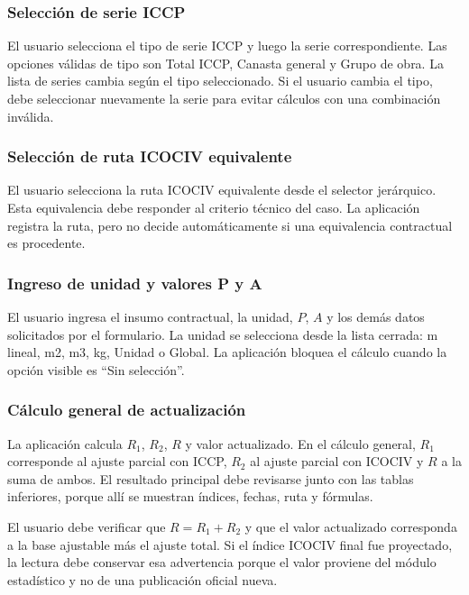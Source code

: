 \documentclass[12pt,letterpaper]{article}
\newcommand{\ICOCIV}{ICOCIV}
\newcommand{\ICCP}{ICCP}
\begin{document}
\subsubsection{Selección de serie ICCP}

El usuario selecciona el tipo de serie \ICCP{} y luego la serie correspondiente. Las opciones válidas de tipo son Total \ICCP, Canasta general y Grupo de obra. La lista de series cambia según el tipo seleccionado. Si el usuario cambia el tipo, debe seleccionar nuevamente la serie para evitar cálculos con una combinación inválida.

\subsubsection{Selección de ruta ICOCIV equivalente}

El usuario selecciona la ruta \ICOCIV{} equivalente desde el selector jerárquico. Esta equivalencia debe responder al criterio técnico del caso. La aplicación registra la ruta, pero no decide automáticamente si una equivalencia contractual es procedente.

\subsubsection{Ingreso de unidad y valores P y A}

El usuario ingresa el insumo contractual, la unidad, \(P\), \(A\) y los demás datos solicitados por el formulario. La unidad se selecciona desde la lista cerrada: m lineal, m2, m3, kg, Unidad o Global. La aplicación bloquea el cálculo cuando la opción visible es ``Sin selección''.

\subsubsection{Cálculo general de actualización}

La aplicación calcula \(R_1\), \(R_2\), \(R\) y valor actualizado. En el cálculo general, \(R_1\) corresponde al ajuste parcial con \ICCP, \(R_2\) al ajuste parcial con \ICOCIV{} y \(R\) a la suma de ambos. El resultado principal debe revisarse junto con las tablas inferiores, porque allí se muestran índices, fechas, ruta y fórmulas.

El usuario debe verificar que \(R=R_1+R_2\) y que el valor actualizado corresponda a la base ajustable más el ajuste total. Si el índice \ICOCIV{} final fue proyectado, la lectura debe conservar esa advertencia porque el valor proviene del módulo estadístico y no de una publicación oficial nueva.
\end{document}
